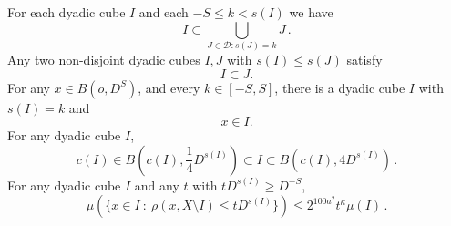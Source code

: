 For each dyadic cube $I$  and each $-S\le k<s(I)$ we have
\begin{equation}\label{coverdyadic}
I\subset \bigcup_{J\in \mathcal {D}: s(J)=k}J\, .
\end{equation}
Any two non-disjoint dyadic cubes  $I,J$ with $s(I)\le s(J)$ satisfy
\begin{equation}\label{dyadicproperty}
I\subset J.
\end{equation}
For any $x\in B(o,D^S)$, and every $k\in[-S,S]$, there
is a dyadic cube $I$ with $s(I)=k$ and
\begin{equation}\label{coverball}
x\in I.
\end{equation}
For any dyadic cube $I$,
 \begin{equation}
        \label{eq-vol-sp-cube}
        c(I)\in B(c(I), \frac{1}{4} D^{s(I)}) \subset I \subset B(c(I), 4 D^{s(I)})\,.
    \end{equation}
For any dyadic cube  $I$ and any $t$ with $tD^{s(I)} \ge D^{-S}$,
\begin{equation}
        \label{eq-small-boundary}
        \mu(\{x \in I \ : \ \rho(x, X \setminus I) \leq t D^{s(I)}\}) \le 2^{100a^2} t^\kappa \mu(I)\,.
    \end{equation}







